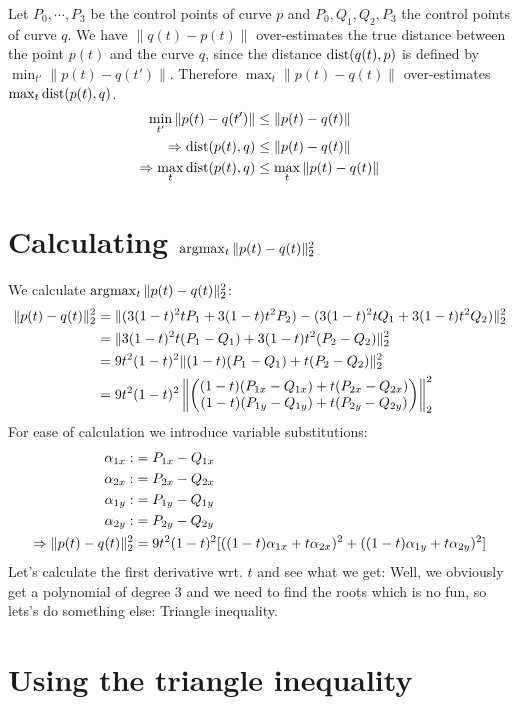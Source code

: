 

Let $P_0, \cdots, P_3$ be the control points of curve $p$ and $P_0, Q_1, Q_2, P_3$
the control points of curve $q$.
We have $\|q(t)-p(t)\|$ over-estimates the true distance between the point $p(t)$ and the curve $q$,
since the distance $\mathrm{dist}(q(t), p)$ is defined by $\min_{t'} \|p(t) - q(t')\|$.
Therefore $\max_{t} \|p(t)-q(t)\|$ over-estimates $\max_t \mathrm{dist}(p(t), q)$.
%
\begin{align}
\min_{t'} \|p(t)-q(t')\| &\leq \|p(t)-q(t)\| \\
\Rightarrow \mathrm{dist}(p(t), q) &\leq \|p(t)-q(t)\| \\
\Rightarrow \max_t \mathrm{dist}(p(t), q) &\leq \max_t \|p(t)-q(t)\|
\end{align}

\section{Calculating $\arg\!\max_t {\|p(t)-q(t)\|_2^2}$}

We calculate $\arg\!\max_t {\|p(t)-q(t)\|_2^2}$:
%
\begin{align}
\|p(t)-q(t)\|_2^2 &= \|(3(1-t)^2 t P_1 + 3 (1-t) t^2 P_2) - (3(1-t)^2 t Q_1 + 3(1-t) t^2 Q_2)\|_2^2 \\
&= \|3(1-t)^2 t (P_1-Q_1) + 3 (1-t) t^2 (P_2 - Q_2)\|_2^2 \\
&= 9 t^2 (1-t)^2 \| (1-t) (P_1-Q_1) + t (P_2 - Q_2)  \|_2^2 \\
&= 9 t^2 (1-t)^2 \left\| \begin{pmatrix} (1-t) (P_{1x} - Q_{1x}) + t(P_{2x} - Q_{2x}) \\ (1-t) (P_{1y} - Q_{1y}) + t(P_{2y} - Q_{2y}) \end{pmatrix} \right\|_2^2
\end{align}
%
For ease of calculation we introduce variable substitutions:
%
\begin{align}
\alpha_{1x} :&= P_{1x} - Q_{1x} \\
\alpha_{2x} :&= P_{2x} - Q_{2x} \\
\alpha_{1y} :&= P_{1y} - Q_{1y} \\
\alpha_{2y} :&= P_{2y} - Q_{2y} \\
\Rightarrow \|p(t)-q(t)\|_2^2 &= 9 t^2 (1-t)^2 [ ((1-t)\alpha_{1x} + t \alpha_{2x})^2 + ((1-t)\alpha_{1y} + t \alpha_{2y})^2 ]
\end{align}
%
Let's calculate the first derivative wrt. $t$ and see what we get:
Well, we obviously get a polynomial of degree 3 and we need to find the roots which
is no fun, so lets's do something else: Triangle inequality.

\section{Using the triangle inequality}

